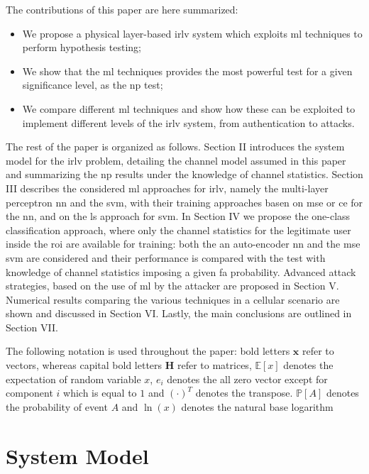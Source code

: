 \documentclass[draftcls,onecolumn,12pt]{IEEEtran}
\begin{document}
The contributions of this paper are here summarized:
\begin{itemize}
    \item We propose a  physical layer-based \ac{irlv} system which exploits \ac{ml} techniques to perform hypothesis testing;
    \item We show that the \ac{ml} techniques provides the most powerful test for a given significance level, as the \ac{np} test;
    \item We compare different \ac{ml} techniques and show how these can be exploited to implement different levels of the \ac{irlv} system, from authentication to attacks.
\end{itemize}

The rest of the paper is organized as follows. Section II introduces the system model for the \ac{irlv} problem, detailing the channel model assumed in this paper and summarizing the \ac{np} results under the knowledge of channel statistics. Section III describes the considered \ac{ml} approaches for \ac{irlv}, namely the multi-layer perceptron \ac{nn} and the \ac{svm}, with their training approaches basen on \ac{mse} or \ac{ce} for the \ac{nn}, and on the \ac{ls} approach for \ac{svm}. In Section IV we propose the one-class classification approach, where only the channel statistics for the legitimate user inside the \ac{roi} are available for training: both the an auto-encoder \ac{nn} and the \ac{mse} \ac{svm} are considered and their performance is compared with the test with knowledge of channel statistics imposing a given \ac{fa} probability. Advanced attack strategies, based on the use of \ac{ml} by the attacker are proposed in Section V. Numerical results comparing the various techniques in a cellular scenario are shown and discussed in Section VI. Lastly, the main conclusions are outlined in Section VII.

The following notation is used throughout the paper: bold letters $\bm{x}$ refer to vectors, whereas capital bold letters $\bm{H}$ refer to matrices, $\mathbb{E}[x]$ denotes the expectation of random variable $x$, $e_i$ denotes the all zero vector except for component $i$ which is equal to $1$ and $(\cdot)^T$ denotes the transpose. $\mathbb P[A]$ denotes the probability of event $A$ and  $\ln(x)$ denotes the natural base logarithm

\section{System Model}
\end{document}
